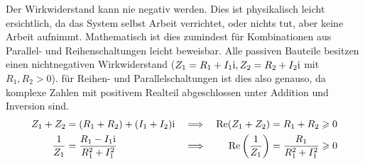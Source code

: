 Der Wirkwiderstand kann nie negativ werden. Dies ist physikalisch leicht ersichtlich, da das System selbst Arbeit verrichtet, oder nichts tut, aber keine Arbeit aufnimmt. Mathematisch ist dies zumindest für Kombinationen aus Parallel- und Reihenschaltungen leicht beweisbar. Alle passiven Bauteile besitzen einen nichtnegativen Wirkwiderstand ($Z_1=R_1+I_1\mathrm{i}, Z_2=R_2+I_2\mathrm{i}$ mit $R_1, R_2 > 0$). für Reihen- und Parallelschaltungen ist dies also genauso, da komplexe Zahlen mit positivem Realteil abgeschlossen unter Addition und Inversion sind.
\begin{align*}
    Z_1 + Z_2 &= (R_1+R_2) + (I_1 + I_2)\mathrm{i} 
    &\implies&& \Re(Z_1 + Z_2) &= R_1+R_2 \geqslant 0\\
    \frac{1}{Z_1} &= \frac{R_1-I_1\mathrm{i}}{R_1^2 + I_1^2}
    &\implies&& \Re\qty(\frac{1}{Z_1}) &= \frac{R_1}{R_1^2 + I_1^2} \geqslant 0
\end{align*}